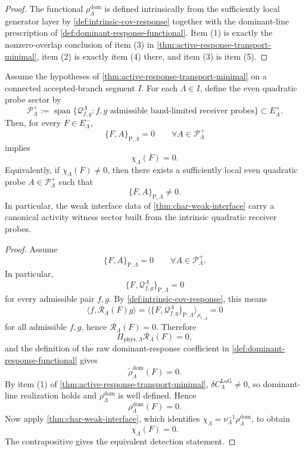 \documentclass[11pt]{article}
\begin{document}
\begin{proof}
The functional \(\rho^{\mathrm{dom}}_{\Lambda}\) is defined intrinsically from the sufficiently local
generator layer by \cref{def:intrinsic-cov-response} together with the dominant-line prescription of
\cref{def:dominant-response-functional}.
Item (1) is exactly the nonzero-overlap conclusion of item (3) in
\cref{thm:active-response-transport-minimal}, item (2) is exactly item (4) there, and item (3) is
item (5).
\end{proof}

\begin{theorem}
\label{thm:char-weak-activity}
Assume the hypotheses of \cref{thm:active-response-transport-minimal} on a connected accepted-branch
segment \(I\).
For each \(\Lambda\in I\), define the even quadratic probe sector by
\[
\mathcal P^+_{\Lambda}
:=
\operatorname{span}
\bigl\{
\mathcal Q^{\Lambda}_{f,g}
:
\text{\(f,g\) admissible band-limited receiver probes}
\bigr\}
\subset E^+_{\Lambda}.
\]
Then, for every \(F\in E^-_{\Lambda}\),
\[
\{F,A\}_{\mathrm P,\Lambda}=0
\qquad
\forall A\in\mathcal P^+_{\Lambda}
\]
implies
\[
\chi_{\Lambda}(F)=0.
\]
Equivalently, if \(\chi_{\Lambda}(F)\neq 0\), then there exists a sufficiently local even quadratic
probe \(A\in\mathcal P^+_{\Lambda}\) such that
\[
\{F,A\}_{\mathrm P,\Lambda}\neq 0.
\]
In particular, the weak interface data of \cref{thm:char-weak-interface} carry a canonical
activity witness sector built from the intrinsic quadratic receiver probes.
\end{theorem}

\begin{proof}
Assume
\[
\{F,A\}_{\mathrm P,\Lambda}=0
\qquad
\forall A\in\mathcal P^+_{\Lambda}.
\]
In particular,
\[
\{F,\mathcal Q^{\Lambda}_{f,g}\}_{\mathrm P,\Lambda}=0
\]
for every admissible pair \(f,g\).
By \cref{def:intrinsic-cov-response}, this means
\[
\big\langle f,\mathcal R_{\Lambda}(F)g\big\rangle
=
\Big\langle
\{F,\mathcal Q^{\Lambda}_{f,g}\}_{\mathrm P,\Lambda}
\Big\rangle_{\rho_{\ast,\Lambda}}
=
0
\]
for all admissible \(f,g\), hence
\(
\mathcal R_{\Lambda}(F)=0
\).
Therefore
\[
\Pi_{\mathrm{phys},\Lambda}\mathcal R_{\Lambda}(F)=0,
\]
and the definition of the raw dominant-response coefficient in
\cref{def:dominant-response-functional} gives
\[
\widetilde\rho^{\mathrm{dom}}_{\Lambda}(F)=0.
\]
By item (1) of \cref{thm:active-response-transport-minimal},
\(
\delta C^{\mathrm{LoG}}_{\Lambda}\neq 0
\),
so dominant-line realization holds and \(\rho^{\mathrm{dom}}_{\Lambda}\) is well defined.
Hence
\[
\rho^{\mathrm{dom}}_{\Lambda}(F)=0.
\]
Now apply \cref{thm:char-weak-interface}, which identifies
\(
\chi_{\Lambda}
=
\nu_{\Lambda}^{-1}\rho^{\mathrm{dom}}_{\Lambda}
\),
to obtain
\[
\chi_{\Lambda}(F)=0.
\]
The contrapositive gives the equivalent detection statement.
\end{proof}
\end{document}
